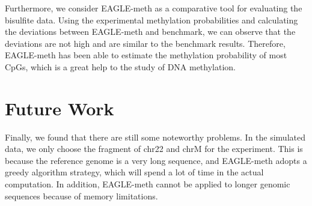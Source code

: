 \documentclass{PHlab-thesis}
\begin{document}
\par
Furthermore, we consider EAGLE-meth as a comparative tool for evaluating the bisulfite data. Using the experimental methylation probabilities and calculating the deviations between EAGLE-meth and benchmark, we can observe that the deviations are not high and are similar to the benchmark results. Therefore, EAGLE-meth has been able to estimate the methylation probability of most CpGs, which is a great help to the study of DNA methylation.

\section{Future Work}
Finally, we found that there are still some noteworthy problems. In the simulated data, we only choose the fragment of chr22 and chrM for the experiment. This is because the reference genome is a very long sequence, and EAGLE-meth adopts a greedy algorithm strategy, which will spend a lot of time in the actual computation. In addition, EAGLE-meth cannot be applied to longer genomic sequences because of memory limitations.





\newpage
{}
\printbibliography
\end{document}
